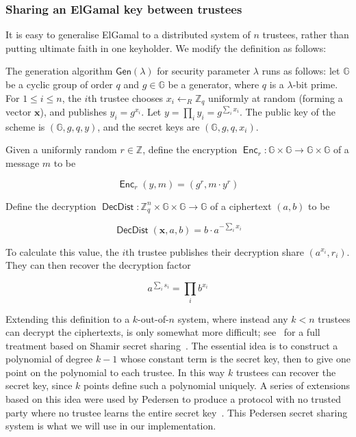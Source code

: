 \documentclass[12pt,a4paper]{article}
\DeclareMathOperator{\Enc}{\mathsf{Enc}}
\DeclareMathOperator{\DecDist}{\mathsf{DecDist}}
\theoremstyle{definition}
\begin{document}
\subsubsection{Sharing an ElGamal key between trustees}
It is easy to generalise ElGamal to a distributed system of $n$ trustees, rather than putting ultimate faith in one keyholder. We modify the definition as follows:
\begin{definition}
    The generation algorithm $\mathsf{Gen}(\lambda)$ for security parameter $\lambda$ runs as follows: let $\mathbb{G}$ be a cyclic group of order $q$ and $g\in\mathbb{G}$ be a generator, where $q$ is a $\lambda$-bit prime. For $1\leq i\leq n$, the $i$th trustee chooses $x_i\gets_R\mathbb{Z}_q$ uniformly at random (forming a vector $\mathbf{x}$), and publishes $y_i=g^{x_i}$. Let $y=\prod_i y_i=g^{\sum_i x_i}$. The public key of the scheme is $(\mathbb{G}, g, q, y)$, and the secret keys are $(\mathbb{G}, g, q, x_i)$.

    Given a uniformly random $r\in\mathbb{Z}$, define the encryption $\Enc_r:\mathbb{G}\times\mathbb{G}\rightarrow\mathbb{G}\times\mathbb{G}$ of a message $m$ to be
    
    $$\Enc_r(y, m) = (g^r, m\cdot y^r)$$

    Define the decryption $\DecDist:\mathbb{Z}_q^n\times\mathbb{G}\times\mathbb{G}\rightarrow \mathbb{G}$ of a ciphertext $(a, b)$ to be
    
    $$\DecDist(\mathbf{x}, a, b)=b\cdot a^{-\sum_i x_i}$$
    
    To calculate this value, the $i$th trustee publishes their decryption share $\left(a^{x_i}, r_i\right)$. They can then recover the decryption factor
    
    $$a^{\sum_i s_i}=\prod_i{b^{x_i}}$$
\end{definition}
Extending this definition to a $k$-out-of-$n$ system, where instead any $k<n$ trustees can decrypt the ciphertexts, is only somewhat more difficult; see~\cite{pedersen1991threshold} for a full treatment based on Shamir secret sharing~\cite{shamir1979share}. The essential idea is to construct a polynomial of degree $k-1$ whose constant term is the secret key, then to give one point on the polynomial to each trustee. In this way $k$ trustees can recover the secret key, since $k$ points define such a polynomial uniquely. A series of extensions based on this idea were used by Pedersen to produce a protocol with no trusted party where no trustee learns the entire secret key~\cite{pedersen1991threshold}. This Pedersen secret sharing system is what we will use in our implementation.
\end{document}
